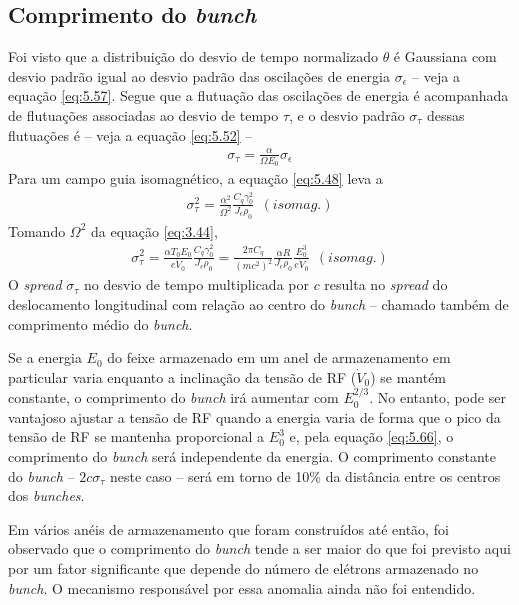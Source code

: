 \subsection{Comprimento do \textit{bunch}}
Foi visto que a distribuição do desvio de tempo normalizado $\theta$ é Gaussiana com desvio padrão igual ao desvio padrão das oscilações de energia $\sigma_\epsilon$ -- veja a equação \eqref{eq:5.57}. Segue que a flutuação das oscilações de energia é acompanhada de flutuações associadas ao desvio de tempo $\tau$, e o desvio padrão $\sigma_\tau$ dessas flutuações é -- veja a equação \eqref{eq:5.52} --
\begin{align}
	\sigma_\tau = \frac{\alpha}{\Omega E_0}\sigma_\epsilon
\end{align}
Para um campo guia isomagnético, a equação \eqref{eq:5.48} leva a
\begin{align}
	\sigma_\tau^2 = \frac{\alpha^2}{\Omega^2} \frac{C_q \gamma_0^2}{J_\epsilon \rho_0}\ \ (isomag.)
\end{align}
Tomando $\Omega^2$ da equação \eqref{eq:3.44},
\begin{align}
	\sigma_\tau^2 = \frac{\alpha T_0 E_0}{e \dot{V}_0}\frac{C_q \gamma_0^2}{J_\epsilon \rho_0} = \frac{2\pi C_q}{(mc^2)^2}\frac{\alpha R}{J_\epsilon \rho_0}\frac{E_0^3}{e \dot{V}_0}\ \ (isomag.)\label{eq:5.66}
\end{align}
O \textit{spread} $\sigma_\tau$ no desvio de tempo multiplicada por $c$ resulta no \textit{spread} do deslocamento longitudinal com relação ao centro do \textit{bunch} -- chamado também de comprimento médio do \textit{bunch}.

Se a energia $E_0$ do feixe armazenado em um anel de armazenamento em particular varia enquanto a inclinação da tensão de RF ($\dot{V}_0$) se mantém constante, o comprimento do \textit{bunch} irá aumentar com $E_0^{2/3}$. No entanto, pode ser vantajoso ajustar a tensão de RF quando a energia varia de forma que o pico da tensão de RF se mantenha proporcional a $E_0^3$ e, pela equação \eqref{eq:5.66}, o comprimento do \textit{bunch} será independente da energia. O comprimento constante do \textit{bunch} -- $2c\sigma_\tau$ neste caso -- será em torno de 10\% da distância entre os centros dos \textit{bunches}.

Em vários anéis de armazenamento que foram construídos até então, foi observado que o comprimento do \textit{bunch} tende a ser maior do que foi previsto aqui por um fator significante que depende do número de elétrons armazenado no \textit{bunch}. O mecanismo responsável por essa anomalia ainda não foi entendido.